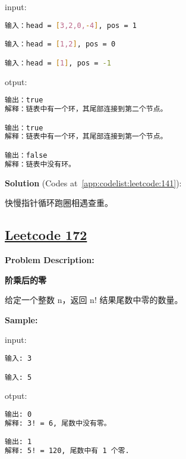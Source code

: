 input:\par

\begin{lstlisting}[language=bash]
输入：head = [3,2,0,-4], pos = 1

输入：head = [1,2], pos = 0

输入：head = [1], pos = -1
\end{lstlisting}

otput:\par

\begin{lstlisting}[language=bash]
输出：true
解释：链表中有一个环，其尾部连接到第二个节点。

输出：true
解释：链表中有一个环，其尾部连接到第一个节点。

输出：false
解释：链表中没有环。
\end{lstlisting}

\textbf{Solution }(Codes at~\ref{app:codelist:leetcode:141}):\par

快慢指针循环跑圈相遇查重。\par



\subsection{\href{https://leetcode-cn.com/}{Leetcode 172}}\label{app:problemlist:leetcode:172}

\textbf{Problem Description:}\par

\textbf{阶乘后的零}\par

给定一个整数 n，返回 n! 结果尾数中零的数量。\par


\textbf{Sample:}\par

input:\par

\begin{lstlisting}[language=bash]
输入: 3

输入: 5
\end{lstlisting}

otput:\par

\begin{lstlisting}[language=bash]
输出: 0
解释: 3! = 6, 尾数中没有零。

输出: 1
解释: 5! = 120, 尾数中有 1 个零.
\end{lstlisting}

